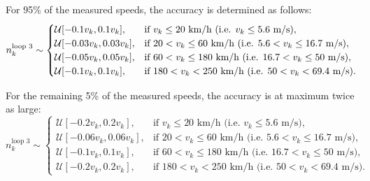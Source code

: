 For 95\% of the measured speeds, the accuracy is determined as follows:
\begin{equation}\label{speed loop noise1}
n_k^\text{loop 3} \sim 
\begin{cases}
\mathcal{U}[-0.1 v_k, 0.1 v_k], & \text{if  \( v_k \leq 20 \) km/h (i.e. \( v_k \leq 5.6 \) m/s)}, \\
\mathcal{U}[-0.03 v_k, 0.03 v_k], & \text{if \( 20 < v_k \leq 60 \) km/h (i.e. \( 5.6 < v_k \leq 16.7 \) m/s)}, \\
\mathcal{U}[-0.05 v_k, 0.05 v_k], & \text{if \( 60 < v_k \leq 180 \) km/h (i.e. \( 16.7 < v_k \leq 50 \) m/s)}, \\
\mathcal{U}[-0.1 v_k, 0.1 v_k], & \text{if \( 180 < v_k < 250 \) km/h (i.e. \( 50 < v_k < 69.4 \) m/s)}.
\end{cases}
\end{equation}

For the remaining 5\% of the measured speeds, the accuracy is at maximum twice as large:
\begin{equation}\label{speed loop noise2}
n_k^\text{loop 3} \sim 
\begin{cases}
\mathcal{U}[-0.2 v_k, 0.2 v_k], & \text{if } v_k \leq 20 \text{ km/h (i.e. } v_k \leq 5.6 \text{ m/s)}, \\
\mathcal{U}[-0.06 v_k, 0.06 v_k], & \text{if } 20 < v_k \leq 60 \text{ km/h (i.e. } 5.6 < v_k \leq 16.7 \text{ m/s)}, \\
\mathcal{U}[-0.1 v_k, 0.1 v_k], & \text{if } 60 < v_k \leq 180 \text{ km/h (i.e. } 16.7 < v_k \leq 50 \text{ m/s)}, \\
\mathcal{U}[-0.2 v_k, 0.2 v_k], & \text{if } 180 < v_k < 250 \text{ km/h (i.e. } 50 < v_k < 69.4 \text{ m/s)}.
\end{cases}
\end{equation}

